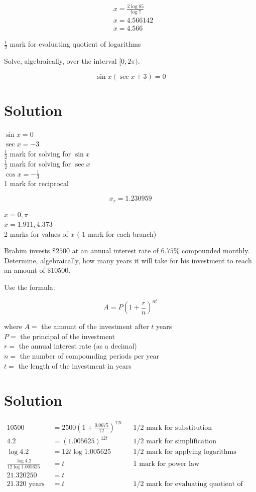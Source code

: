 \documentclass[10pt]{article}
\begin{document}
$$
\begin{aligned}
& x=\frac{2 \log 85}{\log 7} \\
& x=4.566142 \\
& x=4.566
\end{aligned}
$$

$\frac{1}{2}$ mark for evaluating quotient of logarithms

Solve, algebraically, over the interval $[0,2 \pi)$.

$$
\sin x(\sec x+3)=0
$$

\section*{Solution}
$\sin x=0$\\
$\sec x=-3$\\
$\frac{1}{2}$ mark for solving for $\sin x$\\
$\frac{1}{2}$ mark for solving for $\sec x$\\
$\cos x=-\frac{1}{3}$\\
1 mark for reciprocal

$$
x_{r}=1.230959
$$

$x=0, \pi$\\
$x=1.911,4.373$\\
2 marks for values of $x$ ( 1 mark for each branch)

Brahim invests $\$ 2500$ at an annual interest rate of $6.75 \%$ compounded monthly. Determine, algebraically, how many years it will take for his investment to reach an amount of $\$ 10500$.

Use the formula:

$$
A=P\left(1+\frac{r}{n}\right)^{n t}
$$

where $A=$ the amount of the investment after $t$ years\\
$P=$ the principal of the investment\\
$r=$ the annual interest rate (as a decimal)\\
$n=$ the number of compounding periods per year\\
$t=$ the length of the investment in years

\section*{Solution}
$$
\begin{aligned}
10500 & =2500\left(1+\frac{0.0675}{12}\right)^{12 t} & & 1 / 2 \text { mark for substitution } \\
4.2 & =(1.005625)^{12 t} & & 1 / 2 \text { mark for simplification } \\
\log 4.2 & =12 t \log 1.005625 & & 1 / 2 \text { mark for applying logarithms } \\
\frac{\log 4.2}{12 \log 1.005625} & =t & & 1 \text { mark for power law } \\
21.320250 & =t & & \\
21.320 \text { years } & =t & & 1 / 2 \text { mark for evaluating quotient of logarithms }
\end{aligned}
$$
\end{document}
